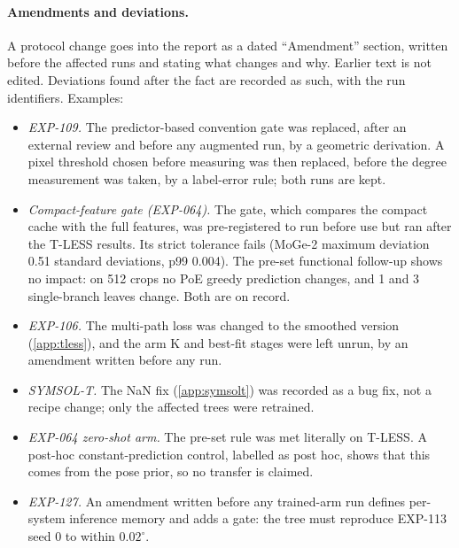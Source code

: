 \paragraph{Amendments and deviations.}
A protocol change goes into the report as a dated ``Amendment'' section, written before the affected runs and stating what changes and why. Earlier text is not edited. Deviations found after the fact are recorded as such, with the run identifiers. Examples:
\begin{itemize}
  \item \emph{EXP-109.} The predictor-based convention gate was replaced, after an external review and before any augmented run, by a geometric derivation. A pixel threshold chosen before measuring was then replaced, before the degree measurement was taken, by a label-error rule; both runs are kept.
  \item \emph{Compact-feature gate (EXP-064).} The gate, which compares the compact cache with the full features, was pre-registered to run before use but ran after the T-LESS results. Its strict tolerance fails (MoGe-2 maximum deviation 0.51 standard deviations, p99 0.004). The pre-set functional follow-up shows no impact: on 512 crops no PoE greedy prediction changes, and 1 and 3 single-branch leaves change. Both are on record.
  \item \emph{EXP-106.} The multi-path loss was changed to the smoothed version (\cref{app:tless}), and the arm K and best-fit stages were left unrun, by an amendment written before any run.
  \item \emph{SYMSOL-T.} The NaN fix (\cref{app:symsolt}) was recorded as a bug fix, not a recipe change; only the affected trees were retrained.
  \item \emph{EXP-064 zero-shot arm.} The pre-set rule was met literally on T-LESS. A post-hoc constant-prediction control, labelled as post hoc, shows that this comes from the pose prior, so no transfer is claimed.
  \item \emph{EXP-127.} An amendment written before any trained-arm run defines per-system inference memory and adds a gate: the tree must reproduce EXP-113 seed 0 to within $0.02^\circ$.
\end{itemize}

